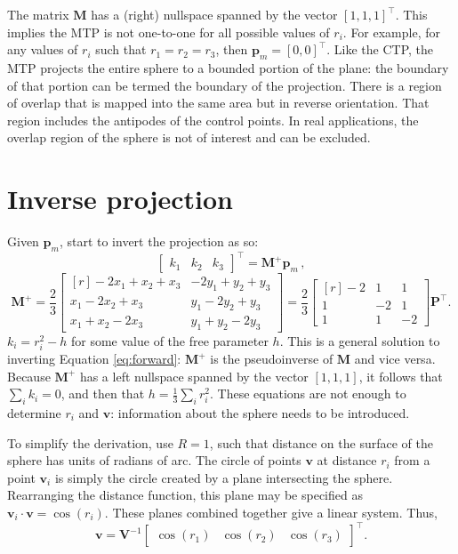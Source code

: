 \documentclass[]{interact}
\begin{document}
The matrix $\mathbf M$ has a (right) nullspace spanned by the vector
$[1, 1, 1]^\top$. This implies the MTP is not one-to-one for all possible values
of $r_i$. For example, for any values of $r_i$ such that $r_1 = r_2 = r_3$, then
$\mathbf p_m = [0, 0]^\top$. Like the CTP, the MTP projects the entire sphere to
a bounded portion of the plane: the boundary of that portion can be termed the
boundary of the projection. There is a region of overlap that is mapped into
the same area but in reverse orientation.
That region includes the antipodes of the control points. In real applications,
the overlap region of the sphere is not of interest and can be excluded.

\section{Inverse projection}
Given $\mathbf p_m$, start to invert the projection as so:
\begin{equation}\label{eq:inverse}
\begin{bmatrix*} k_1 & k_2 & k_3
\end{bmatrix*}^\top = \mathbf M^+ \mathbf p_m \,,
\end{equation}
\begin{equation}\label{eq:inversem}
\mathbf M^+ = \frac{2}{3}
\begin{bmatrix*}[r] -2x_1 + x_2 + x_3 & -2y_1 + y_2 + y_3 \\
x_1 - 2x_2 + x_3 & y_1 - 2y_2 + y_3 \\
x_1 + x_2 - 2x_3 & y_1 + y_2 - 2y_3
\end{bmatrix*} = \frac{2}{3}
\begin{bmatrix*}[r] -2 & 1 & 1 \\
1 & -2 & 1 \\
1 & 1 & -2
\end{bmatrix*}
\mathbf P^\top .
\end{equation}
$k_i = r^2_i - h$ for some value of the free parameter $h$. This is a general
solution to inverting Equation \ref{eq:forward}: $\mathbf M^+$ is the
pseudoinverse of $\mathbf M$ and vice versa. Because $\mathbf M^+$ has a left
nullspace spanned by the vector $[1, 1, 1]$, it follows that $\sum_i k_i = 0$,
and then that $h = \frac{1}{3}\sum_i r^2_i$.
These equations are not enough to determine $r_i$ and $\mathbf v$:
information about the sphere needs to be introduced.

To simplify the derivation, use $R=1$, such that distance on the surface of the
sphere has units of radians of arc. The circle of points $\mathbf v$ at
distance $r_i$ from a point $\mathbf v_i$ is simply the circle created by a
plane intersecting the sphere. Rearranging the distance function, this plane
may be specified as $\mathbf v_i \cdot \mathbf v = \cos\left(r_i\right).$
These planes combined together give a linear system. Thus,
\begin{equation}\label{eq:inversev}
  \mathbf v = \mathbf V^{-1} \begin{bmatrix*} \cos\left(r_1\right) &
  \cos\left(r_2\right) &
  \cos\left(r_3\right)
  \end{bmatrix*}^\top .
\end{equation}
\end{document}

